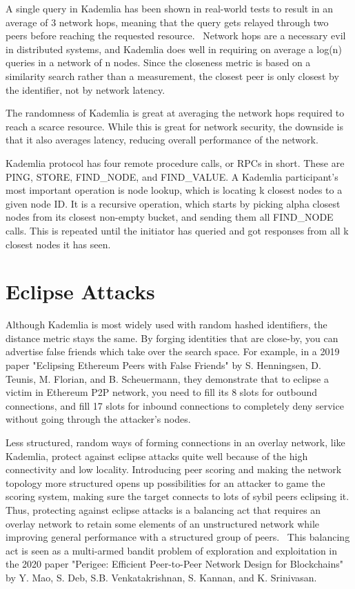 A single query in Kademlia has been shown in real-world tests to result in an average of 3 network hops, meaning that the query gets relayed through two peers before reaching the requested resource.~\cite{Roos2013-mb} Network hops are a necessary evil in distributed systems, and Kademlia does well in requiring on average a log(n) queries in a network of n nodes. Since the closeness metric is based on a similarity search rather than a measurement, the closest peer is only closest by the identifier, not by network latency.~\cite{Eigenmann2020-zm}

The randomness of Kademlia is great at averaging the network hops required to reach a scarce resource. While this is great for network security, the downside is that it also averages latency, reducing overall performance of the network.

Kademlia protocol has four remote procedure calls, or RPCs in short. These are PING, STORE, FIND\_NODE, and FIND\_VALUE. A Kademlia participant's most important operation is node lookup, which is locating k closest nodes to a given node ID. It is a recursive operation, which starts by picking alpha closest nodes from its closest non-empty bucket, and sending them all FIND\_NODE calls. This is repeated until the initiator has queried and got responses from all k closest nodes it has seen.

\section{Eclipse Attacks}
Although Kademlia is most widely used with random hashed identifiers, the distance metric stays the same. By forging identities that are close-by, you can advertise false friends which take over the search space. For example, in a 2019 paper "Eclipsing Ethereum Peers with False Friends" by S. Henningsen, D. Teunis, M. Florian, and B. Scheuermann, they demonstrate that to eclipse a victim in Ethereum P2P network, you need to fill its 8 slots for outbound connections, and fill 17 slots for inbound connections to completely deny service without going through the attacker's nodes.~\cite{Henningsen2019-mf}

Less structured, random ways of forming connections in an overlay network, like Kademlia, protect against eclipse attacks quite well because of the high connectivity and low locality. Introducing peer scoring and making the network topology more structured opens up possibilities for an attacker to game the scoring system, making sure the target connects to lots of sybil peers eclipsing it. Thus, protecting against eclipse attacks is a balancing act that requires an overlay network to retain some elements of an unstructured network while improving general performance with a structured group of peers.~\cite{Mao2020-ee} This balancing act is seen as a multi-armed bandit problem of exploration and exploitation in the 2020 paper "Perigee: Efficient Peer-to-Peer Network Design for Blockchains" by Y. Mao, S. Deb, S.B. Venkatakrishnan, S. Kannan, and K. Srinivasan.


